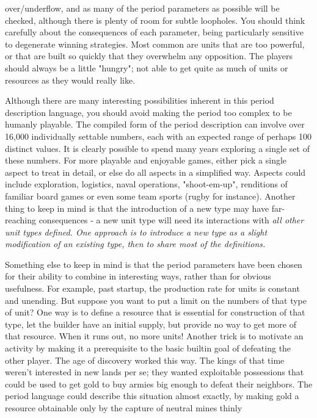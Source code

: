over/underflow, and
as many of the period parameters as possible will be checked, although
there is plenty of room for subtle loopholes.  You should think carefully
about the consequences of each parameter, being particularly sensitive to
degenerate winning strategies.  Most common are units that are too powerful,
or that are built so quickly that they overwhelm any opposition.  The
players should always be a little "hungry"; not able to get quite as much
of units or resources as they would really like.
\par\noindent
Although there are many interesting possibilities inherent in this
period description language, you should avoid making the period too
complex to be humanly playable.  The compiled form of the period description
can involve over 16,000 individually settable numbers, each with an expected
range of perhaps 100 distinct values.  It is clearly possible to spend many
years exploring a single set of these numbers.  For more playable and
enjoyable games, either pick a single aspect to treat in detail, or else
do all aspects in a simplified way.  Aspects could include exploration,
logistics, naval operations, "shoot-em-up", renditions of familiar board
games or even some team sports (rugby for instance).  Another thing to
keep in mind is that the introduction of a new type may have far-reaching
consequences - a new unit type will need its interactions with %
\it all \rm%
other unit types defined.  One approach is to introduce a new type as a
slight modification of an existing type, then to share most of the
definitions.
\par\noindent
Something else to keep in mind is that the period parameters have been
chosen for their ability to combine in interesting ways, rather than for
obvious usefulness.  For example, past startup, the production rate for
units is constant and unending.  But suppose you want to put a limit on
the numbers of that type of unit?  One way is to define a resource that
is essential for construction of that type, let the builder have an initial
supply, but provide no way to get more of that resource.  When it runs out,
no more units!  Another trick is to motivate an activity by making it a
prerequisite to the basic builtin goal of defeating the other player.
The age of discovery worked this way.  The kings of that time weren't
interested in new lands per se;  they wanted exploitable possessions that
could be used to get gold to buy armies big enough to defeat their neighbors.
The period language could describe this situation almost exactly, by making
gold a resource obtainable only by the capture of neutral mines thinly
